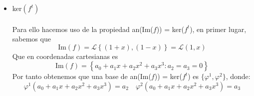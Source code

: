 \documentclass[12pt]{article}
\begin{document}
\begin{enumerate}
\begin{enumerate}
\begin{itemize}
\begin{equation*}
\begin{pmatrix}
					                  a & b \\
					                  c & d
				                  \end{pmatrix}\right) = a-b -d
			                  \end{equation*}
			            \item ker$(f^t)$ \\ \\
			                  Para ello hacemos uso de la propiedad an(Im($f$)) = ker($f^t$), en primer lugar, sabemos que
			                  \begin{equation*}
				                  \text{Im}(f) = \mathcal{L}\left\{(1+x),(1-x)\right\} = \mathcal{L}(1,x)
			                  \end{equation*}
			                  Que en coordenadas cartesianas es
			                  \begin{equation*}
				                  \text{Im}(f) = \left\{ a_0 + a_1 x + a_2 x^2 + a_3 x^3 : a_2 = a_3 = 0\right\}
			                  \end{equation*}
			                  Por tanto obtenemos que una base de an(Im($f$)) = ker($f^t$) es $\{ \varphi^1,\varphi^2\}$, donde:
			                  \begin{equation*}
				                  \varphi^1(a_0 + a_1 x + a_2 x^2 + a_3 x^3) = a_2 \quad \varphi^2(a_0 + a_1 x + a_2 x^2 + a_3 x^3) = a_3
			                  \end{equation*}
		            \end{itemize}	      \end{enumerate}
\end{enumerate}
\end{document}
